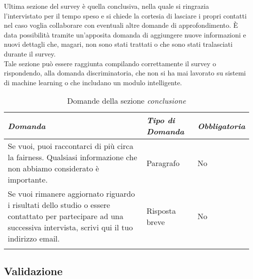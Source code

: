 Ultima sezione del survey è quella conclusiva, nella quale si ringrazia l'intervistato per il tempo speso e si chiede la cortesia di lasciare i propri contatti nel caso voglia collaborare con eventuali altre domande di approfondimento. È data possibilità tramite un'apposita domanda di aggiungere nuove informazioni e nuovi dettagli che, magari, non sono stati trattati o che sono stati tralasciati durante il survey.\\
Tale sezione può essere raggiunta compilando correttamente il survey o rispondendo, alla domanda discriminatoria, che non si ha mai lavorato su sistemi di machine learning o che includano un modulo intelligente.

\begin{longtable}{| p{} | p{} | p{} |} 
\hline\textbf{\textit{Domanda}} & \textbf{\textit{Tipo di Domanda}} & \textbf{\textit{Obbligatoria}}\\
\hline
\endhead 

\hline 
Se vuoi, puoi raccontarci di più circa la fairness. Qualsiasi informazione che non abbiamo considerato è importante.

& Paragrafo

& No

\\ \hline
\rowcolor{Gray!30}
Se vuoi rimanere aggiornato riguardo i risultati dello studio o essere contattato per partecipare ad una successiva intervista, scrivi qui il tuo indirizzo email.

& Risposta breve

& No

\\ \hline
\caption{Domande della sezione \emph{conclusione}} %
\label{tab:myfirstlongtable}
\end{longtable}

\subsection{Validazione}

